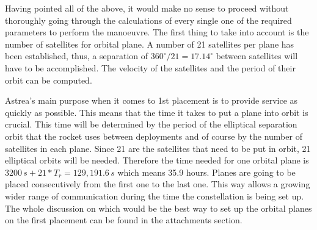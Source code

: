 Having pointed all of the above, it would make no sense to proceed without thoroughly going through the calculations of every single one of the required parameters to perform the manoeuvre. The first thing to take into account is the number of satellites for orbital plane. A number of 21 satellites per plane has been established, thus, a separation of $360^\circ/21 = 17.14^\circ$ between satellites will have to be accomplished. The velocity of the satellites and the period of their orbit can be computed. %
\newline\newline

Astrea's main purpose when it comes to 1st placement is to provide service as quickly as possible. This means that the time it takes to put a plane into orbit is crucial. This time will be determined by the period of the elliptical separation orbit that the rocket uses between deployments and of course by the number of satellites in each plane. Since 21 are the satellites that need to be put in orbit, 21 elliptical orbits will be needed. Therefore the time needed for one orbital plane is $3200\,s + 21*T_r = 129,191.6\,s$ which means 35.9 hours.
Planes are going to be placed consecutively from the first one to the last one. This way allows a growing wider range of communication during the time the constellation is being set up. The whole discussion on which would be the best way to set up the orbital planes on the first placement can be found in the attachments section.





